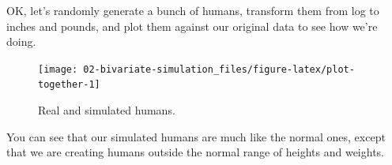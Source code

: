 \documentclass[]{book}
\newenvironment{Shaded}{\begin{snugshade}}{\end{snugshade}}
\newcommand{\CommentTok}[1]{\textcolor[rgb]{0.56,0.35,0.01}{\textit{#1}}}
\newcommand{\DataTypeTok}[1]{\textcolor[rgb]{0.13,0.29,0.53}{#1}}
\newcommand{\DecValTok}[1]{\textcolor[rgb]{0.00,0.00,0.81}{#1}}
\newcommand{\FloatTok}[1]{\textcolor[rgb]{0.00,0.00,0.81}{#1}}
\newcommand{\KeywordTok}[1]{\textcolor[rgb]{0.13,0.29,0.53}{\textbf{#1}}}
\newcommand{\NormalTok}[1]{#1}
\newcommand{\OperatorTok}[1]{\textcolor[rgb]{0.81,0.36,0.00}{\textbf{#1}}}
\newcommand{\StringTok}[1]{\textcolor[rgb]{0.31,0.60,0.02}{#1}}
\begin{document}
OK, let's randomly generate a bunch of humans, transform them from log to inches and pounds, and plot them against our original data to see how we're doing.

\begin{Shaded}
\end{Shaded}

\begin{figure}

{\centering \texttt{[image: 02-bivariate-simulation\_files/figure-latex/plot-together-1]} 

}

\caption{Real and simulated humans.}\label{fig:plot-together}
\end{figure}

You can see that our simulated humans are much like the normal ones, except that we are creating humans outside the normal range of heights and weights.
\end{document}
